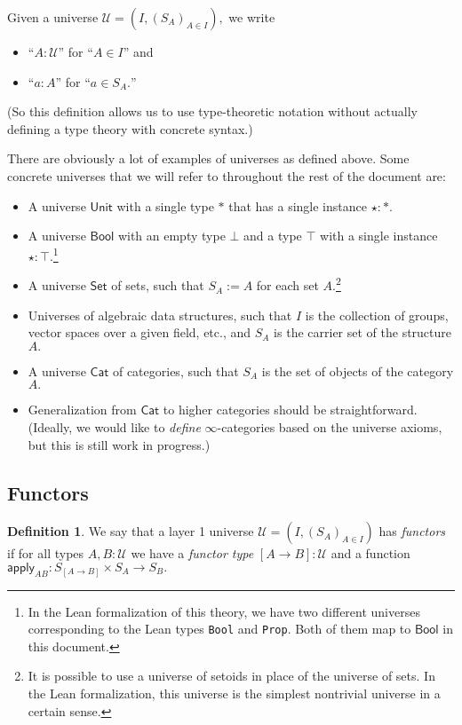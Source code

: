 \documentclass[a4paper]{article}
\theoremstyle{definition}
\newtheorem{definition}{Definition}[section]
\theoremstyle{remark}
\newcommand{\defn}{\emph}
\newcommand{\U}{\mathcal{U}}
\newcommand{\nm}{\mathsf}
\newcommand{\universe}{\nm}
\newcommand{\Unit}{\universe{Unit}}
\newcommand{\Bool}{\universe{Bool}}
\newcommand{\Set}{\universe{Set}}
\newcommand{\Cat}{\universe{Cat}}
\newcommand{\apply}{\nm{apply}}
\newcommand{\Lean}{\texttt}
\begin{document}
Given a universe $\U = (I, (S_A)_{A \in I}),$ we write
\begin{itemize}
  \item ``$A : \U$'' for ``$A \in I$'' and
  \item ``$a : A$'' for ``$a \in S_A.$''
\end{itemize}

(So this definition allows us to use type-theoretic notation without actually defining a type
theory with concrete syntax.)

There are obviously a lot of examples of universes as defined above. Some concrete universes that we
will refer to throughout the rest of the document are:

\begin{itemize}
  \item A universe $\Unit$ with a single type $\ast$ that has a single instance $\star : \ast.$
  \item A universe $\Bool$ with an empty type $\bot$ and a type $\top$ with a single instance
  $\star : \top.$\footnote{In the Lean formalization of this theory, we have two different universes
  corresponding to the Lean types \Lean{Bool} and \Lean{Prop}. Both of them map to $\Bool$ in this
  document.}
  \item A universe $\Set$ of sets, such that $S_A := A$ for each set $A.$\footnote{It is possible
  to use a universe of setoids in place of the universe of sets. In the Lean formalization, this
  universe is the simplest nontrivial universe in a certain sense.}
  \item Universes of algebraic data structures, such that $I$ is the collection of groups, vector
  spaces over a given field, etc., and $S_A$ is the carrier set of the structure $A.$
  \item A universe $\Cat$ of categories, such that $S_A$ is the set of objects of the category $A.$
  \item Generalization from $\Cat$ to higher categories should be straightforward. (Ideally, we
  would like to \emph{define} $\infty$-categories based on the universe axioms, but this is still
  work in progress.)
\end{itemize}

\subsection{Functors}

\begin{definition}
  We say that a layer 1 universe $\U = (I, (S_A)_{A \in I})$ has \defn{functors} if for all types
  $A,B : \U$ we have a \defn{functor type} $[A \to B] : \U$ and a function
  $\apply_{AB} : S_{[A \to B]} \times S_A \to S_B.$
\end{definition}
\end{document}

